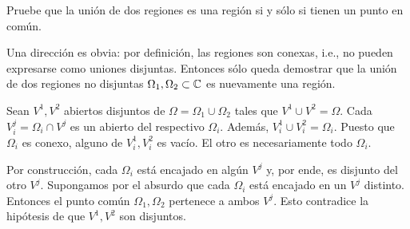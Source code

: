 \begin{exercise}
Pruebe que la unión de dos regiones es una región si y sólo si tienen un punto en común.
\end{exercise}

\begin{solution}
Una dirección es obvia: por definición, las regiones son conexas, i.e., no pueden expresarse como uniones disjuntas. Entonces sólo queda demostrar que la unión de dos regiones no disjuntas $\Omega_1, \Omega_2 \subset \mathbb C$ es nuevamente una región.

Sean $V^1, V^2$ abiertos disjuntos de $\Omega = \Omega_1 \cup \Omega_2$ tales que $V^1 \cup V^2 = \Omega$. Cada $V_i^j = \Omega_i \cap V^j$ es un abierto del respectivo $\Omega_i$. Además, $V_i^1 \cup V_i^2 = \Omega_i$. Puesto que $\Omega_i$ es conexo, alguno de $V_i^1, V_i^2$ es vacío. El otro es necesariamente todo $\Omega_i$.

Por construcción, cada $\Omega_i$ está encajado en algún $V^j$ y, por ende, es disjunto del otro $V^j$. Supongamos por el absurdo que cada $\Omega_i$ está encajado en un $V^j$ distinto. Entonces el punto común $\Omega_1, \Omega_2$ pertenece a ambos $V^j$. Esto contradice la hipótesis de que $V^1, V^2$ son disjuntos.
\end{solution}
